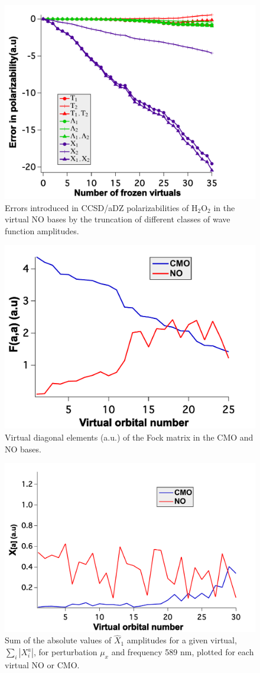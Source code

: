 \begin{figure}
  \centering
  \includegraphics[width=0.6\linewidth]{figures/amp_trunc_no.pdf}
  \caption{Errors introduced in CCSD/aDZ polarizabilities of
H$_2$O$_2$ in the virtual NO bases by the truncation of different classes of wave
function amplitudes.}
   \label{fig:amp_trunc_no}
\end{figure}
\begin{figure}
  \centering
  \includegraphics[width=0.6\linewidth]{figures/Faa.pdf}
  \caption{Virtual diagonal elements (a.u.) of the Fock matrix in
the CMO and NO bases.}
   \label{fig:Faa}
\end{figure}
\begin{figure}
  \centering
  \includegraphics[width=0.6\linewidth]{figures/X1.pdf}
  \caption{Sum of the absolute values of $\hat{X}_1$
amplitudes for a given virtual, $\sum_i \left|X_i^a\right|$, for perturbation $\mu_x$
and frequency 589 nm, plotted for each virtual NO or CMO.}
   \label{fig:X1}
\end{figure}
